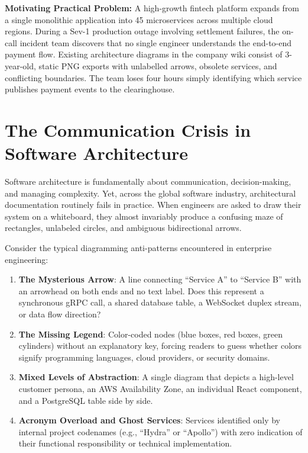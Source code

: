 \begin{chaptergoalsbox}
\textbf{Motivating Practical Problem:}
A high-growth fintech platform expands from a single monolithic application into 45 microservices across multiple cloud regions. During a Sev-1 production outage involving settlement failures, the on-call incident team discovers that no single engineer understands the end-to-end payment flow. Existing architecture diagrams in the company wiki consist of 3-year-old, static PNG exports with unlabelled arrows, obsolete services, and conflicting boundaries. The team loses four hours simply identifying which service publishes payment events to the clearinghouse.
\end{chaptergoalsbox}

\section{The Communication Crisis in Software Architecture}

Software architecture is fundamentally about communication, decision-making, and managing complexity. Yet, across the global software industry, architectural documentation routinely fails in practice. When engineers are asked to draw their system on a whiteboard, they almost invariably produce a confusing maze of rectangles, unlabeled circles, and ambiguous bidirectional arrows. 

Consider the typical diagramming anti-patterns encountered in enterprise engineering:
\begin{enumerate}[leftmargin=18pt]
  \item \textbf{The Mysterious Arrow}: A line connecting ``Service A'' to ``Service B'' with an arrowhead on both ends and no text label. Does this represent a synchronous gRPC call, a shared database table, a WebSocket duplex stream, or data flow direction?
  \item \textbf{The Missing Legend}: Color-coded nodes (blue boxes, red boxes, green cylinders) without an explanatory key, forcing readers to guess whether colors signify programming languages, cloud providers, or security domains.
  \item \textbf{Mixed Levels of Abstraction}: A single diagram that depicts a high-level customer persona, an AWS Availability Zone, an individual React component, and a PostgreSQL table side by side.
  \item \textbf{Acronym Overload and Ghost Services}: Services identified only by internal project codenames (e.g., ``Hydra'' or ``Apollo'') with zero indication of their functional responsibility or technical implementation.
\end{enumerate}

